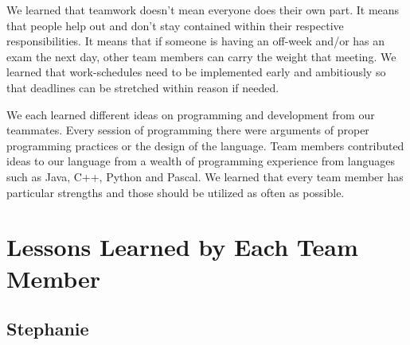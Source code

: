 \documentclass[12pt]{report}
\begin{document}
We learned that teamwork doesn't mean everyone does their own part. It means that people help out and don't stay contained within their respective responsibilities. It means that if someone is having an off-week and/or has an exam the next day, other team members can carry the weight that meeting. We learned that work-schedules need to be implemented early and ambitiously so that deadlines can be stretched within reason if needed.

We each learned different ideas on programming and development from our teammates. Every session of programming there were arguments of proper programming practices or the design of the language. Team members contributed ideas to our language from a wealth of programming experience from languages such as Java, C++, Python and Pascal. We learned that every team member has particular strengths and those should be utilized as often as possible.

\section{Lessons Learned by Each Team Member}

\subsection{Stephanie}
\end{document}
